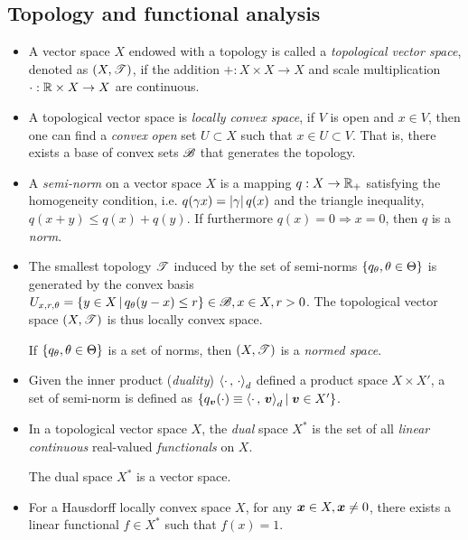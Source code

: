\documentclass[11pt]{article}
\begin{document}
\subsection{Topology and functional analysis}
\begin{itemize}
\item A vector space $X$ endowed with a topology is called a \emph{topological vector space}, denoted as $(X, {\mathscr T})$, if the addition $+: X\times X \rightarrow X$ and scale multiplication $\cdot: {\mathbb R}\times X \rightarrow X$ are continuous. 

\item A topological vector space is \emph{locally convex space}, if $V$ is open and $x\in V$, then one can find a \emph{convex} \emph{open} set $U\subset X$ such that $x\in U\subset V$. That is, there exists a base of convex sets ${\mathscr B}$ that generates the topology. 

\item A \emph{semi-norm} on a vector space $X$ is a mapping $q: X\rightarrow {\mathbb R}_{+}$ satisfying the homogeneity condition, i.e. 
$q(\gamma x) = \left\lvert \gamma \right\rvert q(x)$ and the triangle inequality, $q(x+y)\le q(x)+ q(y)$. If furthermore $q(x)=0 \Rightarrow x=0$, then $q$ is a \emph{norm}.

\item The smallest topology ${\mathscr T}$ induced by the set of semi-norms $\left\{q_{\theta},\theta\in \Theta\right\}$ is generated by the convex basis $U_{x,r,\theta} = \left\{y\in X\,|\, q_{\theta}(y-x) \le r \right\}\in {\mathscr B}, x\in X, r>0$. The topological vector space $(X, {\mathscr T})$ is thus locally convex space. 

If $\left\{q_{\theta},\theta\in \Theta\right\}$ is a set of norms, then $(X, {\mathscr T})$ is a \emph{normed space}. 

\item Given the inner product (\emph{duality}) $\left\langle \cdot\,,\, \cdot \right\rangle_{d}$ defined a product space $X\times X'$, a set of semi-norm is defined as $\left\{ q_{\boldsymbol{v}}(\cdot) \equiv \left\langle \cdot\,,\, \boldsymbol{v} \right\rangle_{d}| \; \boldsymbol{v}\in X'\right\}$.\\[10pt]


\item In a topological vector space $X$, the \emph{dual} space $X^{*}$ is the set of all \emph{linear continuous} real-valued \emph{functionals} on $X$.   

The dual space $X^{*}$ is a vector space.

\item For a Hausdorff locally convex space $X$, for any $\boldsymbol{x}\in X, \boldsymbol{x}\neq 0$, there exists a linear functional $f\in X^{*}$ such that $f(x) = 1$.



\end{itemize}
\end{document}
